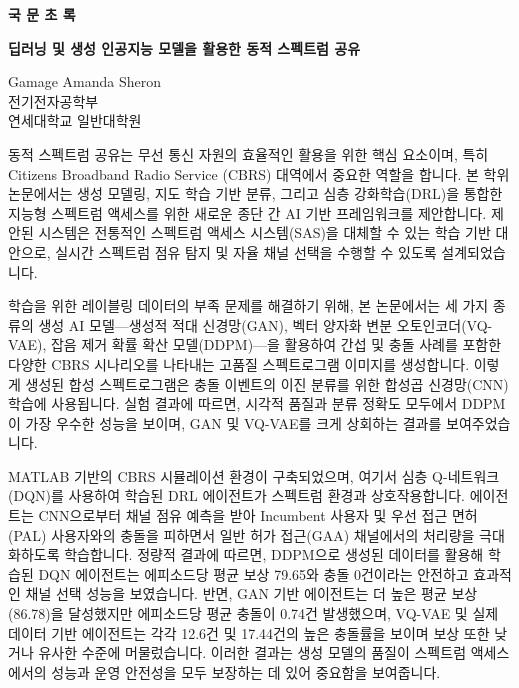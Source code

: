 \clearpage
\begin{flushleft}
    \Large{
        \textbf{국 문 초 록}\\
    }
\vspace{\baselineskip}
\end{flushleft}

\begin{centering}
    \LARGE{
        \textbf{딥러닝 및 생성 인공지능 모델을 활용한 동적 스펙트럼 공유} \\
    }
\vspace{\baselineskip}
\end{centering}


\begin{flushright}
    Gamage Amanda Sheron \\
    전기전자공학부 \\
    연세대학교 일반대학원
\end{flushright}

동적 스펙트럼 공유는 무선 통신 자원의 효율적인 활용을 위한 핵심 요소이며, 특히 Citizens Broadband Radio Service (CBRS) 대역에서 중요한 역할을 합니다. 
본 학위논문에서는 생성 모델링, 지도 학습 기반 분류, 그리고 심층 강화학습(DRL)을 통합한 지능형 스펙트럼 액세스를 위한 새로운 종단 간 AI 기반 프레임워크를 제안합니다. 
제안된 시스템은 전통적인 스펙트럼 액세스 시스템(SAS)을 대체할 수 있는 학습 기반 대안으로, 실시간 스펙트럼 점유 탐지 및 자율 채널 선택을 수행할 수 있도록 설계되었습니다.

학습을 위한 레이블링 데이터의 부족 문제를 해결하기 위해, 본 논문에서는 세 가지 종류의 생성 AI 모델—생성적 적대 신경망(GAN), 벡터 양자화 변분 오토인코더(VQ-VAE), 
잡음 제거 확률 확산 모델(DDPM)—을 활용하여 간섭 및 충돌 사례를 포함한 다양한 CBRS 시나리오를 나타내는 고품질 스펙트로그램 이미지를 생성합니다. 이렇게 생성된 합성 
스펙트로그램은 충돌 이벤트의 이진 분류를 위한 합성곱 신경망(CNN) 학습에 사용됩니다. 실험 결과에 따르면, 시각적 품질과 분류 정확도 모두에서 DDPM이 가장 우수한 성능을 
보이며, GAN 및 VQ-VAE를 크게 상회하는 결과를 보여주었습니다.

MATLAB 기반의 CBRS 시뮬레이션 환경이 구축되었으며, 여기서 심층 Q-네트워크(DQN)를 사용하여 학습된 DRL 에이전트가 스펙트럼 환경과 상호작용합니다. 에이전트는 
CNN으로부터 채널 점유 예측을 받아 Incumbent 사용자 및 우선 접근 면허(PAL) 사용자와의 충돌을 피하면서 일반 허가 접근(GAA) 채널에서의 처리량을 극대화하도록 학습합니다. 
정량적 결과에 따르면, DDPM으로 생성된 데이터를 활용해 학습된 DQN 에이전트는 에피소드당 평균 보상 79.65와 충돌 0건이라는 안전하고 효과적인 채널 선택 성능을 보였습니다. 
반면, GAN 기반 에이전트는 더 높은 평균 보상(86.78)을 달성했지만 에피소드당 평균 충돌이 0.74건 발생했으며, VQ-VAE 및 실제 데이터 기반 에이전트는 각각 12.6건 및 17.44건의 
높은 충돌률을 보이며 보상 또한 낮거나 유사한 수준에 머물렀습니다. 이러한 결과는 생성 모델의 품질이 스펙트럼 액세스에서의 성능과 운영 안전성을 모두 보장하는 데 있어 중요함을 보여줍니다.

